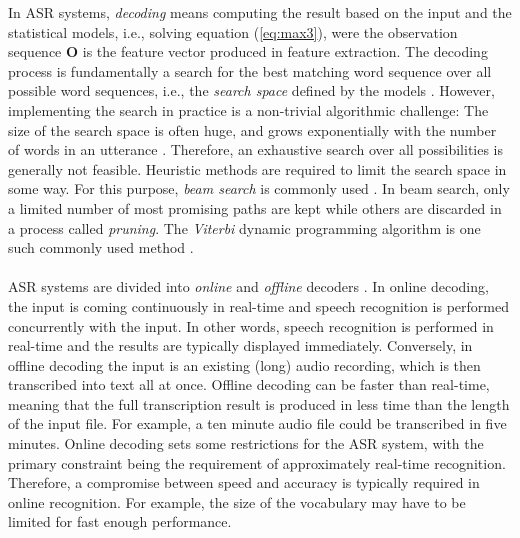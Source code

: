 \documentclass[english, 12pt, a4paper, pdftex, elec, utf8]{aaltothesis}
\begin{document}
In ASR systems, \textit{decoding} means computing the result based on the input and the statistical models, i.e., solving equation (\ref{eq:max3}), were the observation sequence $\bm{O}$ is the feature vector produced in feature extraction. The decoding process is fundamentally a search for the best matching word sequence over all possible word sequences, i.e., the \textit{search space} defined by the models \cite{pylkkonen2013towards}. However, implementing the search in practice is a non-trivial algorithmic challenge: The size of the search space is often huge, and grows exponentially with the number of words in an utterance \cite{pylkkonen2013towards}. Therefore, an exhaustive search over all possibilities is generally not feasible. Heuristic methods are required to limit the search space in some way. For this purpose, \textit{beam search} is commonly used \cite{pylkkonen2013towards, hori2013speech}. In beam search, only a limited number of most promising paths are kept while others are discarded in a process called \textit{pruning}. The \textit{Viterbi} dynamic programming algorithm is one such commonly used method \cite{huang2001spoken, yu2014automatic, hori2013speech}. \\\\
ASR systems are divided into \textit{online} and \textit{offline} decoders \cite{alumae2014full}. In online decoding, the input is coming continuously in real-time and speech recognition is performed concurrently with the input. In other words, speech recognition is performed in real-time and the results are typically displayed immediately. Conversely, in offline decoding the input is an existing (long) audio recording, which is then transcribed into text all at once. Offline decoding can be faster than real-time, meaning that the full transcription result is produced in less time than the length of the input file. For example, a ten minute audio file could be transcribed in five minutes. Online decoding sets some restrictions for the ASR system, with the primary constraint being the requirement of approximately real-time recognition. Therefore, a compromise between speed and accuracy is typically required in online recognition. For example, the size of the vocabulary may have to be limited for fast enough performance. \\\\
\end{document}
